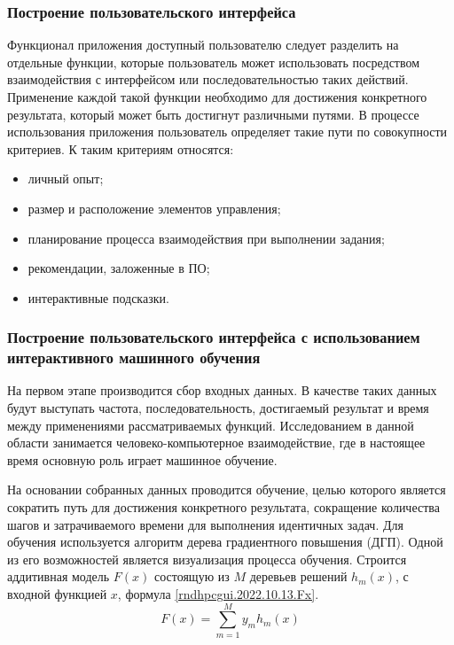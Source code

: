 \def\notedate{2022.10.13}
\def\currentauthor{Василян А.Р. (РК6-73Б)}

\subsubsection{Построение пользовательского интерфейса}

Функционал приложения доступный пользователю следует разделить на отдельные функции, которые пользователь может использовать посредством взаимодействия с интерфейсом или последовательностью таких действий. Применение каждой такой функции необходимо для достижения конкретного результата, который может быть достигнут различными путями. В процессе использования приложения пользователь определяет такие пути по совокупности критериев. К таким критериям относятся:
\begin{itemize}
	\item личный опыт; 
	\item размер и расположение элементов управления;
	\item планирование процесса взаимодействия при выполнении задания;
	\item рекомендации, заложенные в ПО; 
	\item интерактивные подсказки.
\end{itemize}

\subsubsection{Построение пользовательского интерфейса с использованием интерактивного машинного обучения}

На первом этапе производится сбор входных данных. В качестве таких данных будут выступать частота, последовательность, достигаемый результат и время между применениями рассматриваемых функций. Исследованием в данной области занимается человеко-компьютерное взаимодействие, где в настоящее время основную роль играет машинное обучение.

На основании собранных данных проводится обучение, целью которого является сократить путь для достижения конкретного результата, сокращение количества шагов и затрачиваемого времени для выполнения идентичных задач. Для обучения используется алгоритм дерева градиентного повышения (ДГП). Одной из его возможностей является визуализация процесса обучения. Строится аддитивная модель $F(x)$ состоящую из $M$ деревьев решений $h_m(x)$, с входной функцией $x$, формула \eqref{rndhpcgui.2022.10.13.Fx}.
\begin{equation}\label{rndhpcgui.2022.10.13.Fx}
   F(x)=\sum_{m=1}^M y_m h_m(x)
\end{equation}

